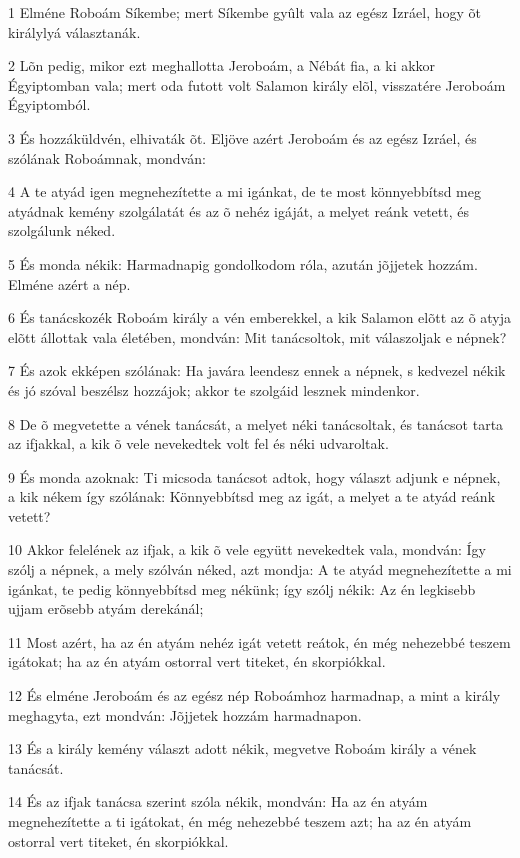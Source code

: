 \par 1 Elméne Roboám Síkembe; mert Síkembe gyûlt vala az egész Izráel, hogy õt királylyá választanák.
\par 2 Lõn pedig, mikor ezt meghallotta Jeroboám, a Nébát fia, a ki akkor Égyiptomban vala; mert oda futott volt Salamon király elõl, visszatére Jeroboám Égyiptomból.
\par 3 És hozzáküldvén, elhivaták õt. Eljöve azért Jeroboám és az egész Izráel, és szólának Roboámnak, mondván:
\par 4 A te atyád igen megnehezítette a mi igánkat, de te most könnyebbítsd meg atyádnak kemény szolgálatát és az õ nehéz igáját, a melyet reánk vetett, és szolgálunk néked.
\par 5 És monda nékik: Harmadnapig gondolkodom róla, azután jõjjetek hozzám. Elméne azért a nép.
\par 6 És tanácskozék Roboám király a vén emberekkel, a kik Salamon elõtt az õ atyja elõtt állottak vala életében, mondván: Mit tanácsoltok, mit válaszoljak e népnek?
\par 7 És azok ekképen szólának: Ha javára leendesz ennek a népnek, s kedvezel nékik és jó szóval beszélsz hozzájok; akkor te szolgáid lesznek mindenkor.
\par 8 De õ megvetette a vének tanácsát, a melyet néki tanácsoltak, és tanácsot tarta az ifjakkal, a kik õ vele nevekedtek volt fel és néki udvaroltak.
\par 9 És monda azoknak: Ti micsoda tanácsot adtok, hogy választ adjunk e népnek, a kik nékem így szólának: Könnyebbítsd meg az igát, a melyet a te atyád reánk vetett?
\par 10 Akkor felelének az ifjak, a kik õ vele együtt nevekedtek vala, mondván: Így szólj a népnek, a mely szólván néked, azt mondja: A te atyád megnehezítette a mi igánkat, te pedig könnyebbítsd meg nékünk; így szólj nékik: Az én legkisebb ujjam erõsebb atyám derekánál;
\par 11 Most azért, ha az én atyám nehéz igát vetett reátok, én még nehezebbé teszem igátokat; ha az én atyám ostorral vert titeket, én skorpiókkal.
\par 12 És elméne Jeroboám és az egész nép Roboámhoz harmadnap, a mint a király meghagyta, ezt mondván: Jõjjetek hozzám harmadnapon.
\par 13 És a király kemény választ adott nékik, megvetve Roboám király a vének tanácsát.
\par 14 És az ifjak tanácsa szerint szóla nékik, mondván: Ha az én atyám megnehezítette a ti igátokat, én még nehezebbé teszem azt; ha az én atyám ostorral vert titeket, én skorpiókkal.
